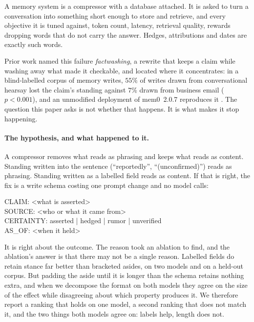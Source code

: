 \documentclass[11pt]{article}
\begin{document}
A memory system is a compressor with a database attached. It is asked to turn a
conversation into something short enough to store and retrieve, and every objective it is
tuned against, token count, latency, retrieval quality, rewards dropping words that do
not carry the answer. Hedges, attributions and dates are exactly such words.

Prior work named this failure \emph{factwashing}, a rewrite that keeps a claim while
washing away what made it checkable, and located where it concentrates: in a
blind-labelled corpus of memory writes, $55\%$ of writes drawn from conversational
hearsay lost the claim's standing against $7\%$ drawn from business email
($p<0.001$), and an unmodified deployment of mem0~2.0.7 reproduces it
\citep{kwon2026factwash}. The question this paper asks is not whether that happens. It is
what makes it stop happening.

\paragraph{The hypothesis, and what happened to it.} A compressor removes what reads as
phrasing and keeps what reads as content. Standing written into the sentence
(``reportedly'', ``(unconfirmed)'') reads as phrasing. Standing written as a labelled
field reads as content. If that is right, the fix is a write schema costing one prompt
change and no model calls:

\begin{promptbox}
CLAIM: <what is asserted>\\
SOURCE: <who or what it came from>\\
CERTAINTY: asserted | hedged | rumor | unverified\\
AS\_OF: <when it held>
\end{promptbox}

It is right about the outcome. The reason took an ablation to find, and the ablation's
answer is that there may not be a single reason. Labelled fields do retain stance far
better than bracketed asides, on two models and on a held-out corpus. But padding the
aside until it is longer than the schema retains nothing extra, and when we decompose the
format on both models they agree on the size of the effect while disagreeing about which
property produces it. We therefore report a ranking that holds on one model, a second
ranking that does not match it, and the two things both models agree on: labels help,
length does not.
\end{document}
